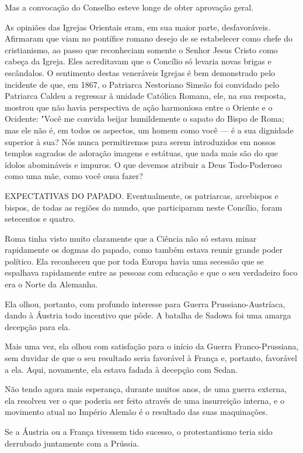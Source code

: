 \documentclass[11pt,a5paper,twoside,openany]{book}
\begin{document}
Mas a convocação do Conselho esteve longe de obter aprovação geral.

As opiniões das Igrejas Orientais eram, em sua maior parte, desfavoráveis. Afirmaram que viam no pontífice romano desejo de se estabelecer como chefe do cristianismo, ao passo que reconheciam somente o Senhor Jesus Cristo como cabeça da Igreja. Eles acreditavam que o Concílio só levaria novas brigas e escândalos. O sentimento destas veneráveis Igrejas é bem demonstrado pelo incidente de que, em 1867, o Patriarca Nestoriano Simeão foi convidado pelo Patriarca Caldeu a regressar à unidade Católica Romana, ele, na sua resposta, mostrou que não havia perspectiva de ação harmoniosa entre o Oriente e o Ocidente: "Você me convida beijar humildemente o sapato do Bispo de Roma; mas ele não é, em todos os aspectos, um homem como você — é a sua dignidade superior à sua? Nós nunca permitiremos para serem introduzidos em nossos templos sagrados de adoração imagens e estátuas, que nada mais são do que ídolos abomináveis e impuros. O que devemos atribuir a Deus Todo-Poderoso como uma mãe, como você ousa fazer?

EXPECTATIVAS DO PAPADO. Eventualmente, os patriarcas, arcebispos e bispos, de todas as regiões do mundo, que participaram neste Concílio, foram setecentos e quatro.

Roma tinha visto muito claramente que a Ciência não só estava minar rapidamente os dogmas do papado, como também estava reunir grande poder político. Ela reconheceu que por toda Europa havia uma secessão que se espalhava rapidamente entre as pessoas com educação e que o seu verdadeiro foco era o Norte da Alemanha.

Ela olhou, portanto, com profundo interesse para Guerra Prussiano-Austríaca, dando à Áustria todo incentivo que pôde. A batalha de Sadowa foi uma amarga decepção para ela.

Mais uma vez, ela olhou com satisfação para o início da Guerra Franco-Prussiana, sem duvidar de que o seu resultado seria favorável à França e, portanto, favorável a ela. Aqui, novamente, ela estava fadada à decepção com Sedan.

Não tendo agora mais esperança, durante muitos anos, de uma guerra externa, ela resolveu ver o que poderia ser feito através de uma insurreição interna, e o movimento atual no Império Alemão é o resultado das suas maquinações.

Se a Áustria ou a França tivessem tido sucesso, o protestantismo teria sido derrubado juntamente com a Prússia.
\end{document}
